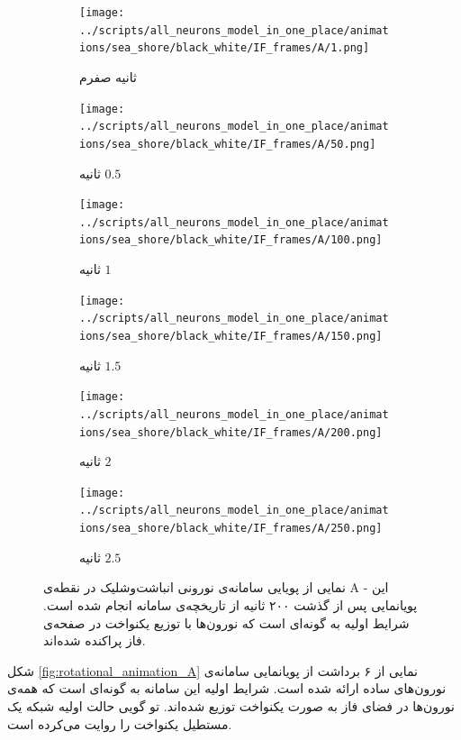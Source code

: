 \newpage
\begin{figure}[!h]
	\begin{subfigure}{0.5\textwidth}
		\texttt{[image: ../scripts/all\_neurons\_model\_in\_one\_place/animations/sea\_shore/black\_white/IF\_frames/A/1.png]}
		\caption{
			ثانیه صفرم		
		}
	\end{subfigure}
	\hfill
	\begin{subfigure}{0.5\textwidth}
		\texttt{[image: ../scripts/all\_neurons\_model\_in\_one\_place/animations/sea\_shore/black\_white/IF\_frames/A/50.png]}
		\caption{
			ثانیه $0.5$
		}
	\end{subfigure}
	\hfill
	\begin{subfigure}{0.5\textwidth}
		\texttt{[image: ../scripts/all\_neurons\_model\_in\_one\_place/animations/sea\_shore/black\_white/IF\_frames/A/100.png]}
		\caption{
			ثانیه $1$		
		}
	\end{subfigure}
	\hfill
	\begin{subfigure}{0.5\textwidth}
		\texttt{[image: ../scripts/all\_neurons\_model\_in\_one\_place/animations/sea\_shore/black\_white/IF\_frames/A/150.png]}
		\caption{
			ثانیه $1.5$
		}
	\end{subfigure}
	\hfill
	\begin{subfigure}{0.5\textwidth}
		\texttt{[image: ../scripts/all\_neurons\_model\_in\_one\_place/animations/sea\_shore/black\_white/IF\_frames/A/200.png]}
		\caption{
			ثانیه $2$
		}
	\end{subfigure}
	\hfill
	\begin{subfigure}{0.5\textwidth}
		\texttt{[image: ../scripts/all\_neurons\_model\_in\_one\_place/animations/sea\_shore/black\_white/IF\_frames/A/250.png]}
		\caption{
			ثانیه $2.5$
		}
	\end{subfigure}
	\hfill
	\caption{
		نمایی از پویایی سامانه‌ی نورونی انباشت‌وشلیک در نقطه‌ی A - این پویانمایی پس از گذشت ۲۰۰ ثانیه از تاریخچه‌ی سامانه انجام شده است. شرایط اولیه به گونه‌ای است که نورون‌ها با توزیع یکنواخت در صفحه‌ی فاز پراکنده شده‌اند.}
	\label{fig:IF_animation_A}
\end{figure}
\newpage
{}
شکل
\ref{fig:rotational_animation_A}
نمایی از ۶ برداشت از پویانمایی سامانه‌ی نورون‌های ساده ارائه شده است. شرایط اولیه این سامانه به گونه‌ای است که همه‌ی نورون‌ها در فضای فاز به صورت یکنواخت توزیع شده‌اند. تو گویی حالت اولیه شبکه یک مستطیل یکنواخت را روایت می‌کرده است.\\

